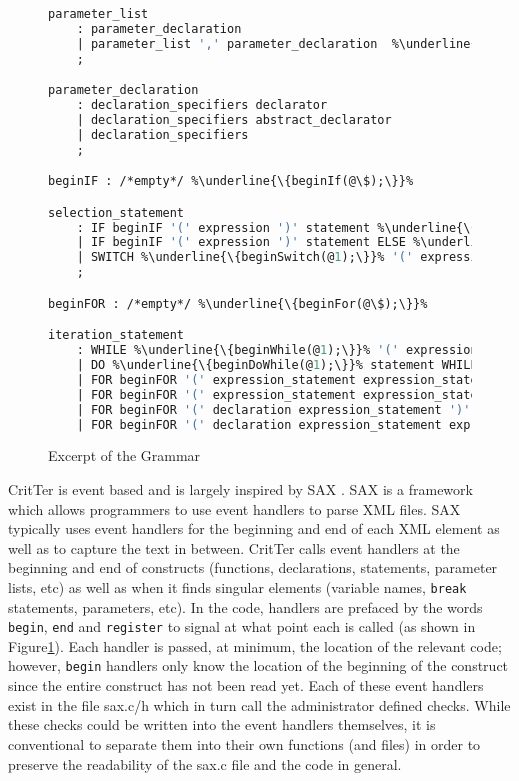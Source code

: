\documentclass[12pt]{report}
\def\lstlistingname{Figure}
\newcommand{\refCode}{\lstlistingname \hspace{1mm}}
\newcommand{\programName}{CritTer\xspace}
\begin{document}
\begin{figure} 
\caption{Excerpt of the Grammar}
\label{grammar}
\begin{lstlisting}[language=Caml, escapechar=\%]
parameter_list
	: parameter_declaration											%\underline{\{h\_registerParameter(@\$);\}}%
	| parameter_list ',' parameter_declaration	%\underline{\{h\_registerParameter(@3);\}}%
	;

parameter_declaration
	: declaration_specifiers declarator
	| declaration_specifiers abstract_declarator
	| declaration_specifiers
	;

beginIF : /*empty*/ %\underline{\{beginIf(@\$);\}}%

selection_statement
	: IF beginIF '(' expression ')' statement %\underline{\{endIf(@\$);\}}%
	| IF beginIF '(' expression ')' statement ELSE %\underline{\{endIf(@6); beginElse(@7);\}}% statement	%\underline{\{endElse(@9);\}}%
	| SWITCH %\underline{\{beginSwitch(@1);\}}% '(' expression ')' statement %\underline{\{endSwitch(@\$);\}}%
	;

beginFOR : /*empty*/ %\underline{\{beginFor(@\$);\}}%

iteration_statement
	: WHILE %\underline{\{beginWhile(@1);\}}% '(' expression ')' statement %\underline{\{endWhile(@\$);\}}%
	| DO %\underline{\{beginDoWhile(@1);\}}% statement WHILE '(' expression ')' ';' %\underline{\{endDoWhile(@\$);\}}%
	| FOR beginFOR '(' expression_statement expression_statement ')' statement	%\underline{\{endFor(@\$);\}}%
	| FOR beginFOR '(' expression_statement expression_statement expression ')' statement %\underline{\{endFor(@\$);\}}%
	| FOR beginFOR '(' declaration expression_statement ')' statement %\underline{\{endFor(@\$);\}}%
	| FOR beginFOR '(' declaration expression_statement expression ')' statement	%\underline{\{endFor(@\$);\}}%

\end{lstlisting}
\end{figure} 

\programName is event based and is largely inspired by SAX \cite{saxHomepage}. SAX is a 
framework which allows programmers to use event handlers to parse XML files. SAX typically uses
event handlers for the beginning and end of each XML element as well as to capture the text in 
between. \programName calls event handlers at the beginning and end of constructs (functions, 
declarations, statements, parameter lists, etc) as well as when it finds singular elements (variable 
names, \lstinline{break} statements, parameters, etc). In the code, handlers are prefaced by the words 
\lstinline{begin}, \lstinline{end} and \lstinline{register} to signal at what point each is called (as shown 
in \refCode \ref{grammar}). Each handler is passed, at minimum, the location of the relevant code; 
however, \lstinline{begin} handlers only know the location of the beginning of the construct since the 
entire construct has not been read yet. Each of these event handlers exist in the file sax.c/h which in 
turn call the administrator defined checks. While these checks could be written into the event handlers 
themselves, it is conventional to separate them into their own functions (and files) in order to preserve 
the readability of the sax.c file and the code in general.
\end{document}
